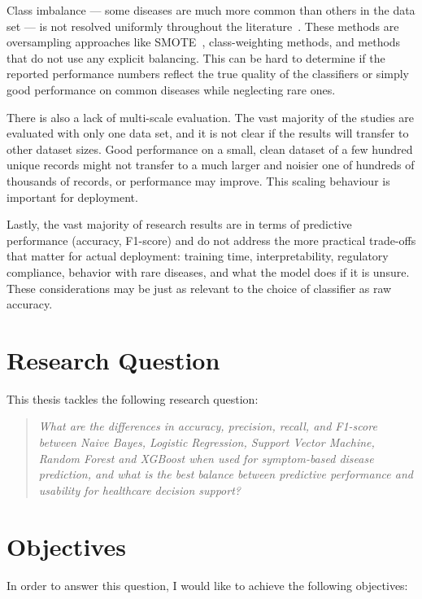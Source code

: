 Class imbalance --- some diseases are much more common than others in the data set --- is not resolved uniformly throughout the literature~\citep{Haixiang2017,Thabtah2020}. These methods are oversampling approaches like SMOTE~\citep{Chawla2002}, class-weighting methods, and methods that do not use any explicit balancing. This can be hard to determine if the reported performance numbers reflect the true quality of the classifiers or simply good performance on common diseases while neglecting rare ones.

There is also a lack of multi-scale evaluation. The vast majority of the studies are evaluated with only one data set, and it is not clear if the results will transfer to other dataset sizes. Good performance on a small, clean dataset of a few hundred unique records might not transfer to a much larger and noisier one of hundreds of thousands of records, or performance may improve. This scaling behaviour is important for deployment.

Lastly, the vast majority of research results are in terms of predictive performance (accuracy, F1-score) and do not address the more practical trade-offs that matter for actual deployment: training time, interpretability, regulatory compliance, behavior with rare diseases, and what the model does if it is unsure. These considerations may be just as relevant to the choice of classifier as raw accuracy.

\section{Research Question}
\label{sec:research_question}

This thesis tackles the following research question:

\begin{quote}
\textit{What are the differences in accuracy, precision, recall, and F1-score between Naive Bayes, Logistic Regression, Support Vector Machine, Random Forest and XGBoost when used for symptom-based disease prediction, and what is the best balance between predictive performance and usability for healthcare decision support?}
\end{quote}

\section{Objectives}
\label{sec:objectives}

In order to answer this question, I would like to achieve the following objectives:

